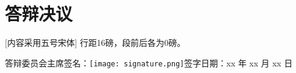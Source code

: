 
\setlength{\baselineskip}{16pt}
\chapter{答辩决议}
\setlength{\parindent}{0pt}


\hspace{2em}[内容采用五号宋体]  行距16磅，段前后各为0磅。



\vspace{72pt}
\hspace{2em}答辩委员会主席签名：\hspace{1.5em}\texttt{[image: signature.png]}\hspace{4em}签字日期：xx 年 xx 月 xx 日

